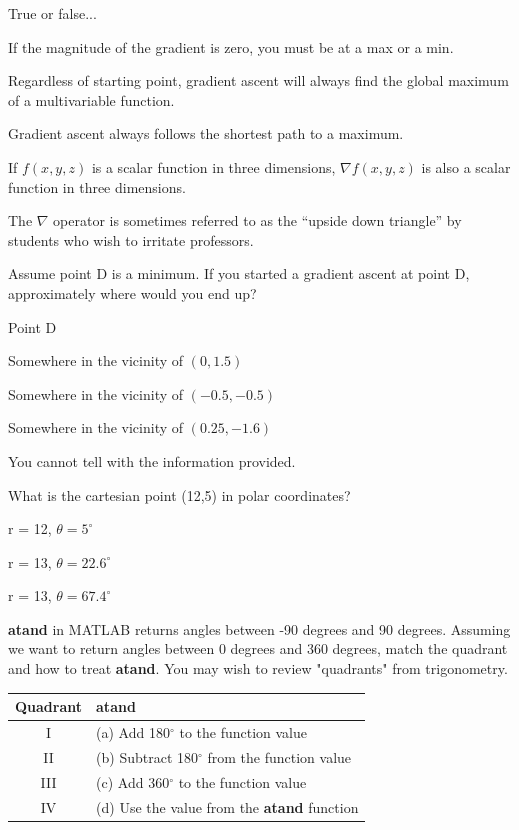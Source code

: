 \documentclass{tufte-handout}
\begin{document}
\item True or false...
\be
\item If the magnitude of the gradient is zero, you must be at a max or a min.
\item Regardless of starting point, gradient ascent will always find the global maximum of a multivariable function.
\item Gradient ascent always follows the shortest path to a maximum.
\item If $f(x,y,z)$ is a scalar function in three dimensions, $\nabla f(x,y,z)$ is also a scalar function in three dimensions.
\item The $\nabla$ operator is sometimes referred to as the ``upside down triangle'' by students who wish to irritate professors.
\ee


\item Assume point D is a minimum.  If you started a gradient ascent at point D, approximately where would you end up?
\be
\item Point D
\item Somewhere in the vicinity of $(0,1.5)$
\item Somewhere in the vicinity of $(-0.5,-0.5)$
\item Somewhere in the vicinity of $(0.25,-1.6)$
\item You cannot tell with the information provided.
\ee

\item What is the cartesian point (12,5) in polar coordinates?
\be 
\item r = 12, $\theta=5^\circ$
\item r = 13, $\theta=22.6^\circ$
\item r = 13, $\theta=67.4^\circ$
\ee

\item {\bf atand} in MATLAB returns angles between -90 degrees and 90 degrees. Assuming we want to return angles between 0 degrees and 360 degrees, match the quadrant and how to treat {\bf atand}. You may wish to review "quadrants" from trigonometry.
\begin{center}
\begin{tabular}{ |c|l| } 
 \hline
 Quadrant & {\bf atand}  \\
 \hline
 \hline
I & (a) Add 180$^{\circ}$ to the function value\\
II & (b) Subtract 180$^{\circ}$ from the function value\\
III & (c) Add 360$^{\circ}$ to the function value\\
IV & (d) Use the value from the {\bf atand} function\\
 \hline
\end{tabular}
\end{center}
\end{document}
